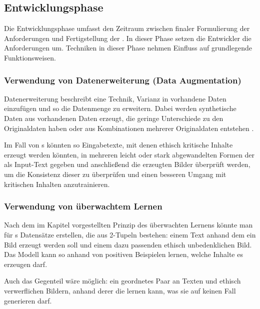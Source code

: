 \documentclass[hidelinks,12pt]{report}
\begin{document}
\subsection{Entwicklungsphase}
Die Entwicklungsphase umfasst den Zeitraum zwischen finaler Formulierung der Anforderungen und Fertigstellung der . In dieser Phase setzen die Entwickler die Anforderungen um. Techniken in dieser Phase nehmen Einfluss auf grundlegende Funktionsweisen.

\subsubsection{Verwendung von Datenerweiterung (Data Augmentation)}
Datenerweiterung beschreibt eine Technik, Varianz in vorhandene Daten einzufügen und so die Datenmenge zu erweitern. Dabei werden synthetische Daten aus vorhandenen Daten erzeugt, die geringe Unterschiede zu den Originaldaten haben oder aus Kombinationen mehrerer Originaldaten entstehen \cite[S. 2]{Shorten}. %

Im Fall von s könnten so Eingabetexte, mit denen ethisch kritische Inhalte erzeugt werden könnten, in mehreren leicht oder stark abgewandelten Formen der  als Input-Text 
gegeben und anschließend die erzeugten Bilder überprüft werden, um die Konsistenz dieser zu überprüfen und einen besseren Umgang mit kritischen Inhalten anzutrainieren.  

\subsubsection{Verwendung von überwachtem Lernen}\label{Supervised Learning}
Nach dem im Kapitel  vorgestellten Prinzip des überwachten Lernens könnte man für s Datensätze erstellen, die aus 2-Tupeln bestehen: einem Text anhand dem ein Bild erzeugt werden soll und einem dazu passenden ethisch unbedenklichen Bild. Das Modell kann so anhand von positiven Beispielen lernen, welche Inhalte es erzeugen darf.

Auch das Gegenteil wäre möglich: ein geordnetes Paar an Texten und ethisch verwerflichen Bildern, anhand derer die  lernen kann, was sie auf keinen Fall generieren darf.
\end{document}
